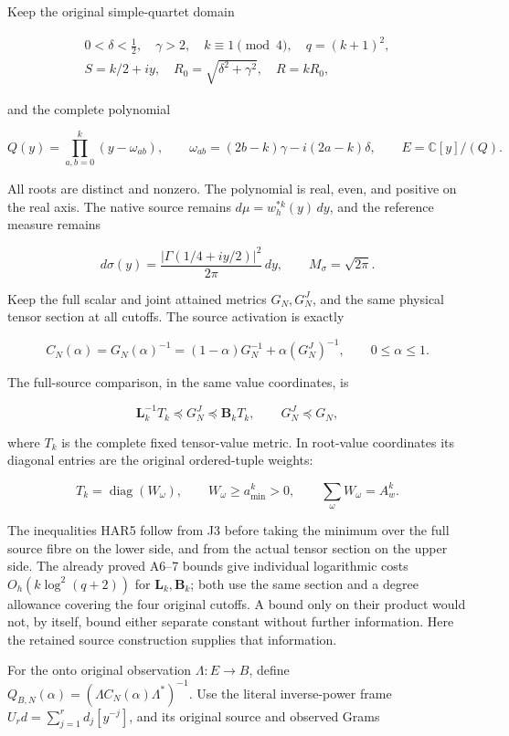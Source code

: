 \documentclass[11pt]{article}
\begin{document}
Keep the original simple-quartet domain

\[
\begin{gathered}
0<\delta<\tfrac12,\quad\gamma>2,\quad k\equiv1\pmod4,
\quad q=(k+1)^2,\\
S=k/2+iy,\quad R_0=\sqrt{\delta^2+\gamma^2},\quad R=kR_0,
\end{gathered}
\tag{HAR1}
\]

and the complete polynomial

\[
Q(y)=\prod_{a,b=0}^k(y-\omega_{ab}),\qquad
\omega_{ab}=(2b-k)\gamma-i(2a-k)\delta,
\qquad E=\mathbb C[y]/(Q).
\tag{HAR2}
\]

All roots are distinct and nonzero. The polynomial is real, even, and positive on the real axis. The native source remains \(d\mu=w_h^{*k}(y)\,dy\), and the reference measure remains

\[
d\sigma(y)=\frac{|\Gamma(1/4+iy/2)|^2}{2\pi}\,dy,
\qquad M_\sigma=\sqrt{2\pi}.
\tag{HAR3}
\]

Keep the full scalar and joint attained metrics \(G_N,G_N^J\), and the same physical tensor section at all cutoffs. The source activation is exactly

\[
C_N(\alpha)=G_N(\alpha)^{-1}
=(1-\alpha)G_N^{-1}+\alpha(G_N^J)^{-1},\qquad0\le\alpha\le1.
\tag{HAR4}
\]

The full-source comparison, in the same value coordinates, is

\[
\mathbf L_k^{-1}T_k\preceq G_N^J\preceq\mathbf B_kT_k,
\qquad G_N^J\preceq G_N,
\tag{HAR5}
\]

where \(T_k\) is the complete fixed tensor-value metric. In root-value coordinates its diagonal entries are the original ordered-tuple weights:

\[
T_k=\operatorname{diag}(W_\omega),\qquad
W_\omega\ge a_{\min}^k>0,
\qquad\sum_\omega W_\omega=A_w^k.
\tag{HAR6}
\]

The inequalities HAR5 follow from J3 before taking the minimum over the full source fibre on the lower side, and from the actual tensor section on the upper side. The already proved A6--7 bounds give individual logarithmic costs \(O_h(k\log^2(q+2))\) for \(\mathbf L_k,\mathbf B_k\); both use the same section and a degree allowance covering the four original cutoffs. A bound only on their product would not, by itself, bound either separate constant without further information. Here the retained source construction supplies that information.

For the onto original observation \(\Lambda:E\to B\), define \(Q_{B,N}(\alpha)=(\Lambda C_N(\alpha)\Lambda^*)^{-1}\). Use the literal inverse-power frame \(U_rd=\sum_{j=1}^rd_j[y^{-j}]\), and its original source and observed Grams
\end{document}
